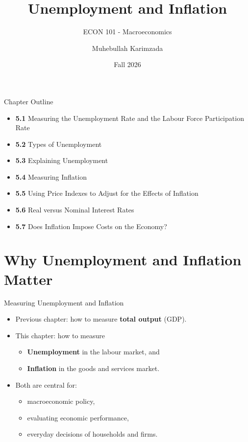 \documentclass[aspectratio=169]{beamer}
\title{\textbf{Unemployment and Inflation \vspace{.5cm}\\  }}
\subtitle{ {\large ECON 101 - Macroeconomics}}
\author{Muhebullah Karimzada}
\date{Fall 2026}
\begin{document}
\begin{frame}[plain]
  \titlepage
\end{frame}

\begin{frame}{Chapter Outline}
\transfade
\begin{itemize}[<+->]
  \item \textbf{5.1} Measuring the Unemployment Rate and the Labour Force Participation Rate
  \item \textbf{5.2} Types of Unemployment
  \item \textbf{5.3} Explaining Unemployment
  \item \textbf{5.4} Measuring Inflation
  \item \textbf{5.5} Using Price Indexes to Adjust for the Effects of Inflation
  \item \textbf{5.6} Real versus Nominal Interest Rates
  \item \textbf{5.7} Does Inflation Impose Costs on the Economy?
\end{itemize}
\end{frame}

\section*{Why Unemployment and Inflation Matter}

\begin{frame}{Measuring Unemployment and Inflation}
\transfade
\begin{itemize}[<+->]
  \item Previous chapter: how to measure \textbf{total output} (GDP).
  \item This chapter: how to measure
  \begin{itemize}[<+->]
    \item \textbf{Unemployment} in the labour market, and
    \item \textbf{Inflation} in the goods and services market.
  \end{itemize}
  \item Both are central for:
  \begin{itemize}[<+->]
    \item macroeconomic policy,
    \item evaluating economic performance,
    \item everyday decisions of households and firms.
  \end{itemize}
\end{itemize}
\end{frame}
\end{document}
